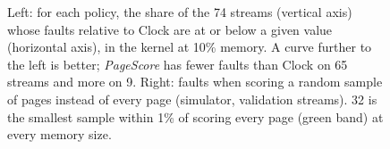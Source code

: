 \documentclass{article}
\newcommand{\clock}{Clock\xspace}
\DeclareRobustCommand{\pagescore}{\textit{PageScore}}
\begin{document}
\begin{figure}[t]
\caption{Left: for each policy, the share of the 74 streams (vertical axis) whose faults relative to \clock are at or below a given value (horizontal axis), in the kernel at 10\% memory. A curve further to the left is better; \pagescore{} has fewer faults than \clock on 65 streams and more on 9. Right: faults when scoring a random sample of pages instead of every page (simulator, validation streams). 32 is the smallest sample within 1\% of scoring every page (green band) at every memory size.}
\label{fig:dist}
\end{figure}
\end{document}
